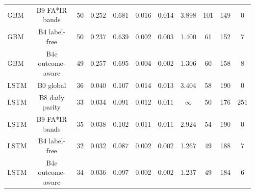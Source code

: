 \documentclass[10pt,onecolumn,letterpaper]{article}
\begin{document}
\begin{table}[!t]
{\begin{tabular}{lcccccccccc}
GBM & B9 FA*IR bands & 50 & 0.252 & 0.681 & 0.016 & 0.014 & 3.898 & 101 & 149 & 0 \\
GBM & B4 label-free & 50 & 0.237 & 0.639 & 0.002 & 0.003 & 1.400 & 61 & 152 & 7 \\
GBM & B4c outcome-aware & 49 & 0.257 & 0.695 & 0.004 & 0.002 & 1.306 & 60 & 158 & 8 \\
LSTM & B0 global & 36 & 0.040 & 0.107 & 0.014 & 0.013 & 3.404 & 58 & 190 & 0 \\
LSTM & B8 daily parity & 33 & 0.034 & 0.091 & 0.012 & 0.011 & $\infty$ & 50 & 176 & 251 \\
LSTM & B9 FA*IR bands & 35 & 0.038 & 0.102 & 0.011 & 0.011 & 2.924 & 54 & 190 & 0 \\
LSTM & B4 label-free & 32 & 0.032 & 0.087 & 0.002 & 0.002 & 1.267 & 49 & 188 & 7 \\
LSTM & B4c outcome-aware & 34 & 0.036 & 0.097 & 0.002 & 0.002 & 1.237 & 49 & 184 & 6 \\
\bottomrule
\end{tabular}}
\end{table}
\end{document}
